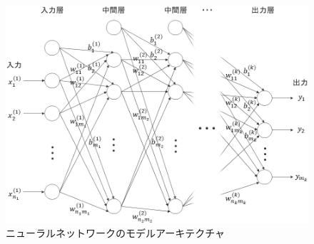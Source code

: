 \documentclass[12pt,a4j,dvipdfmx]{jreport}
\begin{document}
\begin{figure}[H]
	\centering
	\includegraphics[keepaspectratio, width=120mm]{img/nn_v02.png}
	\caption{ニューラルネットワークのモデルアーキテクチャ}
	\label{fig_nn}
\end{figure}
\end{document}
